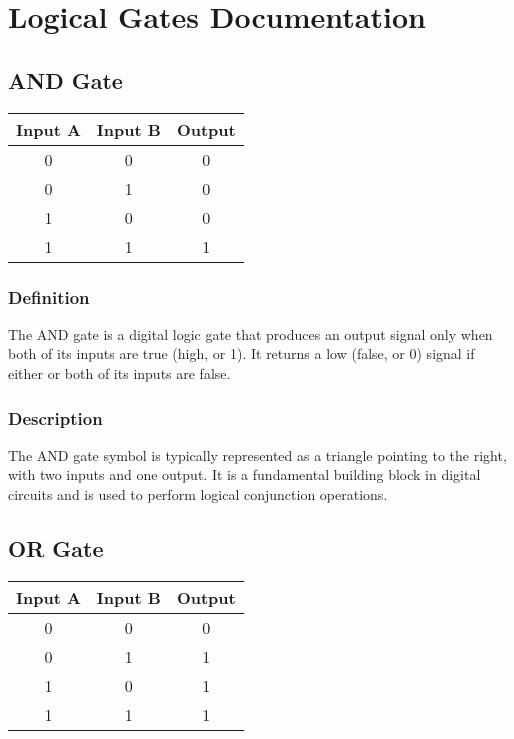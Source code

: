 \documentclass{article}
\begin{document}
\section{Logical Gates Documentation}

\subsection{AND Gate}

\begin{center}
  \begin{tabular}{|c|c|c|}
    \hline
    \textbf{Input A} & \textbf{Input B} & \textbf{Output} \\
    \hline
    0 & 0 & 0 \\
    0 & 1 & 0 \\
    1 & 0 & 0 \\
    1 & 1 & 1 \\
    \hline
  \end{tabular}
\end{center}

\subsubsection{Definition} 
The AND gate is a digital logic gate that produces an output signal only when both of its inputs are true (high, or 1). It returns a low (false, or 0) signal if either or both of its inputs are false.

\subsubsection{Description} 
The AND gate symbol is typically represented as a triangle pointing to the right, with two inputs and one output. It is a fundamental building block in digital circuits and is used to perform logical conjunction operations.

\subsection{OR Gate}
\begin{center}
  \begin{tabular}{|c|c|c|}
    \hline
    \textbf{Input A} & \textbf{Input B} & \textbf{Output} \\
    \hline
    0 & 0 & 0 \\
    0 & 1 & 1 \\
    1 & 0 & 1 \\
    1 & 1 & 1 \\
    \hline
  \end{tabular}
\end{center}
\end{document}
